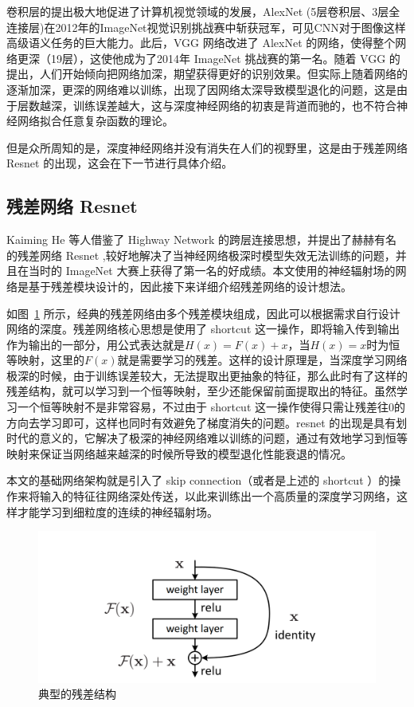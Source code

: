 卷积层的提出极大地促进了计算机视觉领域的发展，AlexNet\cite{2012ImageNet} (5层卷积层、3层全连接层)在2012年的ImageNet视觉识别挑战赛中斩获冠军，可见CNN对于图像这样高级语义任务的巨大能力。此后，VGG\cite{simonyan2014very} 网络改进了 AlexNet 的网络，使得整个网络更深（19层），这使他成为了2014年 ImageNet 挑战赛的第一名。随着 VGG 的提出，人们开始倾向把网络加深，期望获得更好的识别效果。但实际上随着网络的逐渐加深，更深的网络难以训练，出现了因网络太深导致模型退化的问题，这是由于层数越深，训练误差越大，这与深度神经网络的初衷是背道而驰的，也不符合神经网络拟合任意复杂函数的理论。

但是众所周知的是，深度神经网络并没有消失在人们的视野里，这是由于残差网络 Resnet 的出现，这会在下一节进行具体介绍。
\subsection{残差网络 Resnet}
Kaiming He 等人借鉴了 Highway Network\cite{srivastava2015highway} 的跨层连接思想，并提出了赫赫有名的残差网络 Resnet\cite{he2016deep} ,较好地解决了当神经网络极深时模型失效无法训练的问题，并且在当时的 ImageNet 大赛上获得了第一名的好成绩。本文使用的神经辐射场的网络是基于残差模块设计的，因此接下来详细介绍残差网络的设计想法。

如图~\ref{fig:resnet} 所示，经典的残差网络由多个残差模块组成，因此可以根据需求自行设计网络的深度。残差网络核心思想是使用了 shortcut 这一操作，即将输入传到输出作为输出的一部分，用公式表达就是$H(x) = F(x) + x$，当$H(x) = x$时为恒等映射，这里的$F(x)$就是需要学习的残差。这样的设计原理是，当深度学习网络极深的时候，由于训练误差较大，无法提取出更抽象的特征，那么此时有了这样的残差结构，就可以学习到一个恒等映射，至少还能保留前面提取出的特征。虽然学习一个恒等映射不是非常容易，不过由于 shortcut 这一操作使得只需让残差往0的方向去学习即可，这样也同时有效避免了梯度消失的问题。resnet 的出现是具有划时代的意义的，它解决了极深的神经网络难以训练的问题，通过有效地学习到恒等映射来保证当网络越来越深的时候所导致的模型退化性能衰退的情况。

本文的基础网络架构就是引入了 skip connection（或者是上述的 shortcut ）的操作来将输入的特征往网络深处传送，以此来训练出一个高质量的深度学习网络，这样才能学习到细粒度的连续的神经辐射场。

\begin{figure}[t]
    \centering
    \includegraphics[width=0.7\linewidth]{figures/resnet.jpg}
    \caption{典型的残差结构\cite{he2016deep}}
    \label{fig:resnet}
\end{figure}

